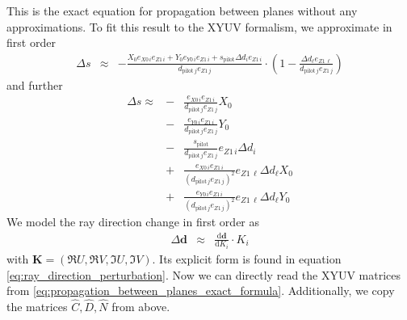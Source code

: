 \documentclass[12pt,a4paper,twoside,openright,BCOR10mm,headsepline,titlepage,abstracton,chapterprefix,final]{scrreprt}
\newcommand\Vector[1]{{\mathbf{#1}}}
\newcommand\totald{\textrm{d}}
\newcommand\pilot{\textrm{pilot}}
\begin{document}
This is the exact equation for propagation between planes without any approximations.
To fit this result to the XYUV formalism, we approximate in first order
\begin{eqnarray}
  \Delta s &\approx& - \frac{ X_0 e_{X0\,i}e_{Z1\,i} + Y_0 e_{Y0\,i}e_{Z1\,i} + s_{\pilot} \Delta d_i e_{Z1\,i}  }
                            {d_{\pilot\,j} e_{Z1\,j}}
                            \cdot
                            \left(
                            1 - \frac{ \Delta d_{\ell} e_{Z1\,\ell}}{d_{\pilot\,j} e_{Z1\,j}}
                            \right)
\end{eqnarray}
and further
\begin{eqnarray}
  \Delta s \approx &-& \frac{  e_{X0\,i}e_{Z1\,i} }{d_{\pilot\,j} e_{Z1\,j}} X_0 \nonumber\\
                   &-& \frac{  e_{Y0\,i}e_{Z1\,i} }{d_{\pilot\,j} e_{Z1\,j}} Y_0 \nonumber\\
                   &-& \frac{ s_{\pilot}   }{d_{\pilot\,j} e_{Z1\,j}}e_{Z1\,i} \Delta d_i \nonumber\\
                   &+& \frac{ e_{X0\,i}e_{Z1\,i} }{ (d_{\pilot\,j} e_{Z1\,j} )^2 }
                             e_{Z1\,\ell} \Delta d_{\ell} X_0  \nonumber\\
                   &+& \frac{ e_{Y0\,i}e_{Z1\,i} }{ (d_{\pilot\,j} e_{Z1\,j} )^2 }
                             e_{Z1\,\ell} \Delta d_{\ell} Y_0 
\end{eqnarray}
We model the ray direction change in first order as
\begin{eqnarray}
 \Delta \Vector{d} &\approx& \frac{\totald \Vector{d}}{\totald K_i} \cdot K_i
\end{eqnarray}
with $\Vector{K} = (\Re U, \Re V, \Im U, \Im V)$. 
Its explicit form is found in equation \eqref{eq:ray_direction_perturbation}.
Now we can directly read the XYUV matrices from \eqref{eq:propagation_between_planes_exact_formula}.
Additionally, we copy the matrices $\hat{C},\hat{D},\hat{N}$ from above.
\end{document}
